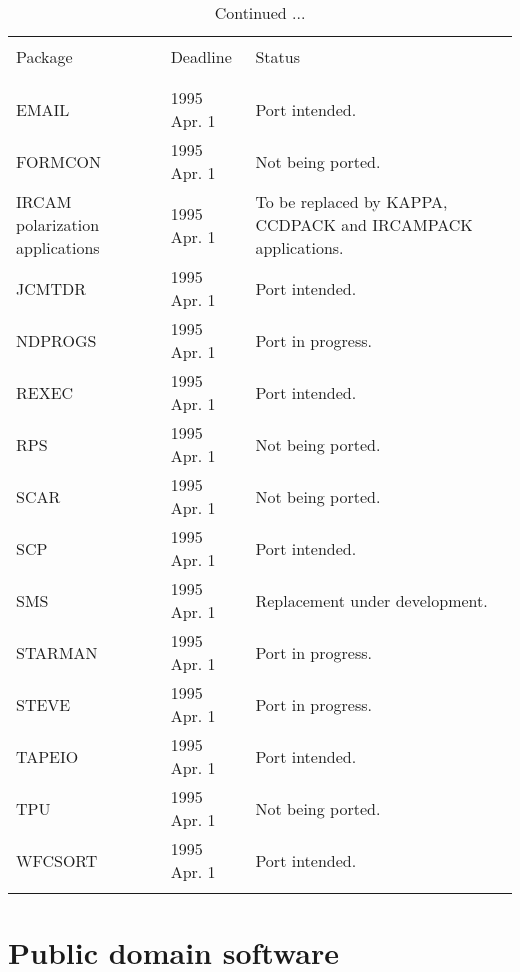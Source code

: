 \addtocounter{table}{-1}
\begin{table}
\caption{Continued ...}
\vspace{5mm}
\begin{center}
\begin{tabular}{|p{36mm}|p{30mm}|p{60mm}|} \hline 
& & \\
Package & Deadline & Status \\
& & \\ \hline
& & \\
EMAIL                           & 1995 Apr. 1  & Port intended. \\
FORMCON                         & 1995 Apr. 1  & Not being ported. \\
IRCAM polarization applications & 1995 Apr. 1  & To be replaced by
   KAPPA, CCDPACK and IRCAMPACK applications. \\
JCMTDR                          & 1995 Apr. 1  & Port intended. \\
NDPROGS                         & 1995 Apr. 1  & Port in progress. \\
REXEC                           & 1995 Apr. 1  & Port intended. \\
RPS                             & 1995 Apr. 1  & Not being ported. \\
SCAR                            & 1995 Apr. 1  & Not being ported. \\
SCP                             & 1995 Apr. 1  & Port intended. \\
SMS                             & 1995 Apr. 1  & Replacement under 
   development. \\
STARMAN                         & 1995 Apr. 1  & Port in progress. \\
STEVE                           & 1995 Apr. 1  & Port in progress. \\
TAPEIO                          & 1995 Apr. 1  & Port intended. \\
TPU                             & 1995 Apr. 1  & Not being ported. \\
WFCSORT                         & 1995 Apr. 1  & Port intended. \\
& & \\ \hline
\end{tabular}
\end{center}
\end{table}

\newpage
\section{Public domain software}

